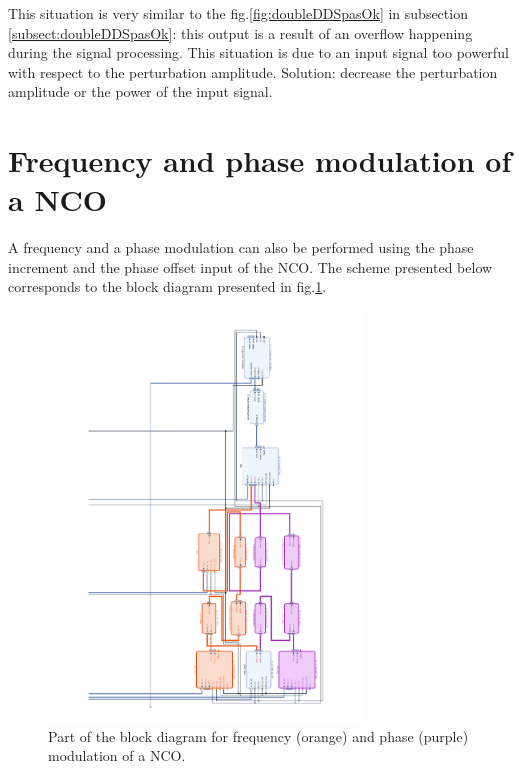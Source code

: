 \documentclass[12pt,oneside]{article}
\begin{document}
This situation is very similar to the fig.\ref{fig:doubleDDSpasOk} in subsection \ref{subsect:doubleDDSpasOk}: this output is a result of an overflow happening during the signal processing. This situation is due to an input signal too powerful with respect to the perturbation amplitude.
Solution: decrease the perturbation amplitude or the power of the input signal. 


\section{Frequency and phase modulation of a NCO}\label{sect:FMPM}

A frequency and a phase modulation can also be performed using the phase increment and the phase offset input of the NCO. The scheme presented below corresponds to the block diagram presented in fig.\ref{fig:mod_phase}.

\begin{figure}[h!tbp]
	\begin{center}
		\vspace{-3.5cm}
		\includegraphics[width=8.4cm,trim={9.8cm 1cm 2.5cm 0cm}, clip]{design/FMPM4.pdf}
		\caption{Part of the block diagram for frequency (orange) and phase (purple) modulation of a NCO.}
		\label{fig:mod_phase}
	\end{center}
\end{figure}
\end{document}
